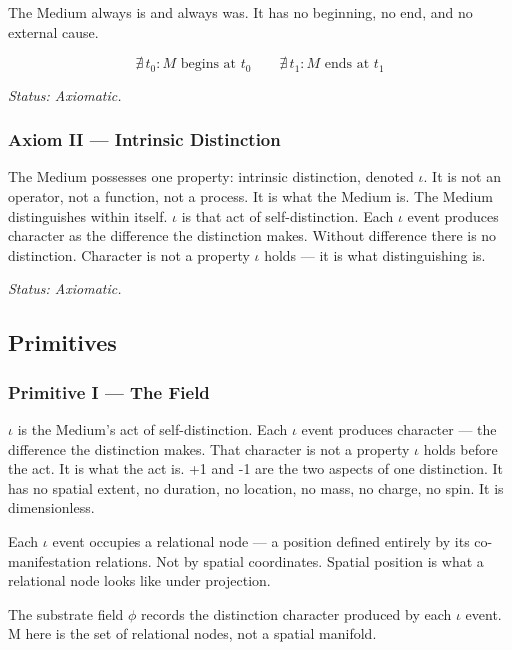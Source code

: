 \documentclass[11pt,letterpaper]{article}
\begin{document}
The Medium always is and always was. It has no beginning, no end, and no external cause.

\begin{equation}
\nexists\, t_0 : M \text{ begins at } t_0 \qquad \nexists\, t_1 : M \text{ ends at } t_1
\end{equation}

\emph{Status: Axiomatic.}

\subsubsection{Axiom II --- Intrinsic Distinction}
\label{sec:org75cc3b1}


The Medium possesses one property: intrinsic distinction, denoted \(\iota\). It is not an operator, not a function, not a process. It is what the Medium is. The Medium distinguishes within itself. \(\iota\) is that act of self-distinction. Each \(\iota\) event produces character as the difference the distinction makes. Without difference there is no distinction. Character is not a property \(\iota\) holds --- it is what distinguishing is.

\emph{Status: Axiomatic.}

\subsection{Primitives}
\label{sec:org109ca8a}

\subsubsection{Primitive I --- The Field}
\label{sec:orgbb16fe9}


\(\iota\) is the Medium's act of self-distinction. Each \(\iota\) event produces character --- the difference the distinction makes. That character is not a property \(\iota\) holds before the act. It is what the act is. +1 and -1 are the two aspects of one distinction. It has no spatial extent, no duration, no location, no mass, no charge, no spin. It is dimensionless.

Each \(\iota\) event occupies a relational node --- a position defined entirely by its co-manifestation relations. Not by spatial coordinates. Spatial position is what a relational node looks like under projection.

The substrate field \(\phi\) records the distinction character produced by each \(\iota\) event. M here is the set of relational nodes, not a spatial manifold.
\end{document}
